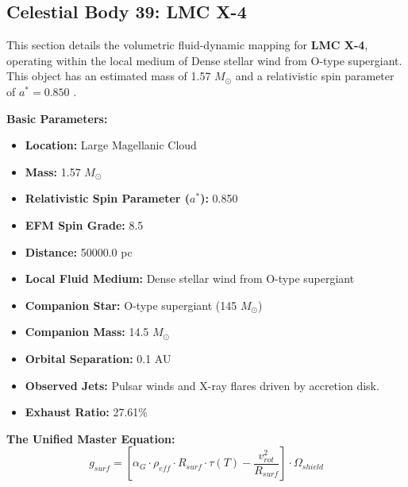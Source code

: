\documentclass[11pt, a4paper]{article}
\begin{document}
\clearpage
\subsection{Celestial Body 39: LMC X-4}
This section details the volumetric fluid-dynamic mapping for \textbf{LMC X-4}, operating within the local medium of Dense stellar wind from O-type supergiant. This object has an estimated mass of 1.57 $M_{\odot}$ and a relativistic spin parameter of $a^* = 0.850$ \cite{vandermeer2007, simbad}.

\vspace{0.5em}
\noindent \textbf{Basic Parameters:}
\begin{itemize}
  \item \textbf{Location:} Large Magellanic Cloud
  \item \textbf{Mass:} 1.57 $M_{\odot}$
  \item \textbf{Relativistic Spin Parameter ($a^*$):} 0.850
  \item \textbf{EFM Spin Grade:} 8.5
  \item \textbf{Distance:} 50000.0 pc
  \item \textbf{Local Fluid Medium:} Dense stellar wind from O-type supergiant
  \item \textbf{Companion Star:} O-type supergiant (145 $M_{\odot}$)
  \item \textbf{Companion Mass:} 14.5 $M_{\odot}$
  \item \textbf{Orbital Separation:} 0.1 AU
  \item \textbf{Observed Jets:} Pulsar winds and X-ray flares driven by accretion disk.
  \item \textbf{Exhaust Ratio:} 27.61\%
\end{itemize}

\vspace{0.5em}
\noindent \textbf{The Unified Master Equation:}
$$ g_{surf} = \left[ \alpha_G \cdot \rho_{eff} \cdot R_{surf} \cdot \tau(T) - \frac{v_{rot}^2}{R_{surf}} \right] \cdot \Omega_{shield} $$
\end{document}
